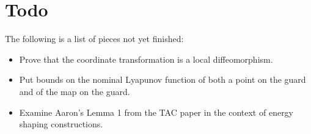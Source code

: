 \documentclass[twocolumn]{article}
\begin{document}
\section*{Todo}
The following is a list of pieces not yet finished:
\begin{itemize}
\item Prove that the coordinate transformation is a local diffeomorphism.
\item Put bounds on the nominal Lyapunov function of both a point on the guard and of the \Poincare{} map on the guard.
\item Examine Aaron's Lemma 1 from the TAC paper in the context of energy shaping constructions.
\end{itemize}
\end{document}
